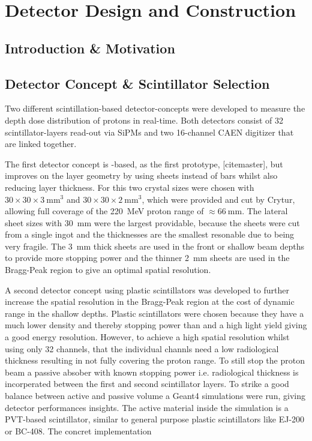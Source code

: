 \chapter{Detector Design and Construction}\label{chapter:setup}

\section{Introduction \& Motivation}

\section{Detector Concept \& Scintillator Selection}\label{section:detector:concept}
Two different scintillation-based detector-concepts were developed to measure the depth dose distribution of protons in real-time.
Both detectors consist of 32 scintillator-layers read-out via \glspl{SiPM} and two 16-channel CAEN digitizer that are linked together.

The first detector concept is -based, as the first prototype,  [citemaster], but improves on the layer geometry by using sheets instead of bars whilst also reducing layer thickness.
For this two crystal sizes were chosen with $30\times30\times3~\text{mm}^3$ and $30\times30\times2~\text{mm}^3$, which were provided and cut by Crytur, allowing full coverage of the \SI{220}{\mega\electronvolt} proton range of $\approx \SI{66}{\mm}$.
The lateral sheet sizes with \SI{30}{\mm} were the largest providable, because the sheets were cut from a single ingot and the thicknesses are the smallest resonable due to  being very fragile.
The \SI{3}{\mm} thick sheets are used in the front or shallow beam depths to provide more stopping power and the thinner \SI{2}{\mm} sheets are used in the Bragg-Peak region to give an optimal spatial resolution.

A second  detector concept using plastic scintillators was developed to further increase the spatial resolution in the Bragg-Peak region at the cost of dynamic range in the shallow depths. 
Plastic scintillators were chosen because they have a much lower density and thereby stopping power than  and a high light yield giving a good energy resolution.
However, to achieve a high spatial resolution whilst using only 32 channels, that the individual channls need a low radiological thickness resulting in not fully covering the proton range.
To still stop the proton beam a passive absober with known stopping power i.e. radiological thickness is incorperated between the first and second scintillator layers.
To strike a good balance between active and passive volume a Geant4 simulations were run, giving detector performances insights.
The active material inside the simulation is a PVT-based scintillator, similar to general purpose plastic scintillators like EJ-200 or BC-408.
The concret implementation  

